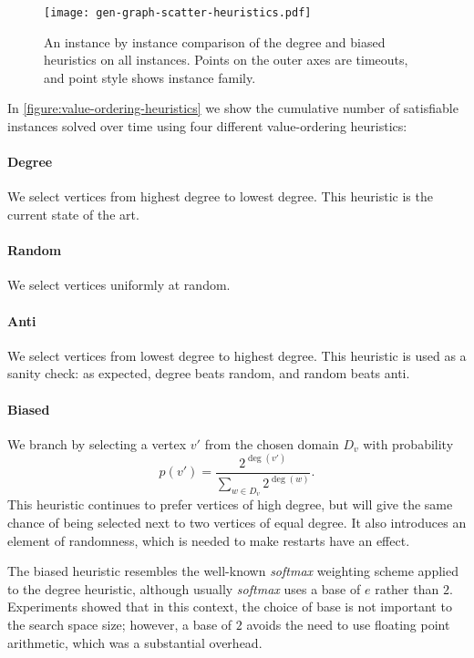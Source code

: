 \documentclass{article}
\begin{document}
\begin{figure}[p]
    \centering
    \texttt{[image: gen-graph-scatter-heuristics.pdf]}

    \caption{An instance by instance comparison of the degree and biased heuristics on all
    instances. Points on the outer axes are timeouts, and point style shows instance family.}
    \label{figure:scatter-heuristics}
\end{figure}

In \cref{figure:value-ordering-heuristics} we show the cumulative number of satisfiable instances
solved over time using four different value-ordering heuristics:

\paragraph{Degree} We select vertices from highest degree to lowest degree. This heuristic is the
current state of the art.

\paragraph{Random} We select vertices uniformly at random.

\paragraph{Anti} We select vertices from lowest degree to highest degree. This heuristic is used as
a sanity check: as expected, degree beats random, and random beats anti.

\paragraph{Biased} We branch by selecting a vertex $v'$ from the chosen domain $D_v$ with
probability \[ p(v') = \frac{2^{\deg(v')}}{\sum_{w \in D_v}{2^{\deg(w)}}} \text{.} \] This heuristic
continues to prefer vertices of high degree, but will give the same chance of being selected next to
two vertices of equal degree.  It also introduces an element of randomness, which is needed to make
restarts have an effect.

The biased heuristic resembles the well-known \emph{softmax} weighting scheme applied to the degree
heuristic, although usually \emph{softmax} uses a base of $e$ rather than $2$.  Experiments showed
that in this context, the choice of base is not important to the search space size; however, a base
of $2$ avoids the need to use floating point arithmetic, which was a substantial overhead.
\end{document}
